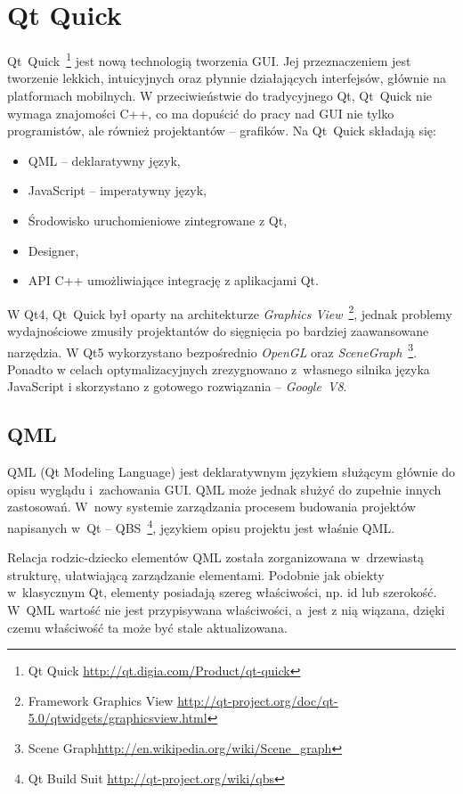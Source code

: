 \section{Qt Quick}
Qt~Quick~\footnote{Qt Quick \url{http://qt.digia.com/Product/qt-quick}} jest nową technologią tworzenia GUI. Jej przeznaczeniem jest tworzenie lekkich, intuicyjnych oraz płynnie działających interfejsów, głównie na platformach mobilnych. W przeciwieństwie do tradycyjnego Qt, Qt~Quick nie wymaga znajomości C++, co ma dopuścić do pracy nad GUI nie tylko programistów, ale również projektantów -- grafików.
Na Qt~Quick składają się:
\begin{itemize}
\item QML -- deklaratywny język,
\item JavaScript -- imperatywny język,
\item Środowisko uruchomieniowe zintegrowane z Qt,
\item Designer,
\item API C++ umożliwiające integrację z aplikacjami Qt.
\end{itemize}

W Qt4, Qt~Quick był oparty na architekturze \textit{Graphics View}~\footnote{Framework Graphics View  \url{http://qt-project.org/doc/qt-5.0/qtwidgets/graphicsview.html}}, jednak problemy wydajnościowe zmusiły projektantów do sięgnięcia po bardziej zaawansowane narzędzia. W Qt5 wykorzystano bezpośrednio \textit{OpenGL} oraz \textit{SceneGraph}~\footnote{Scene Graph\url{http://en.wikipedia.org/wiki/Scene\_graph}}. Ponadto w celach optymalizacyjnych zrezygnowano z~własnego silnika języka JavaScript i skorzystano z gotowego rozwiązania -- \textit{Google~V8}.

\subsection{QML}
QML (Qt Modeling Language) jest deklaratywnym językiem służącym głównie do opisu wyglądu i~zachowania GUI. QML może jednak służyć do zupełnie innych zastosowań. W~nowy systemie zarządzania procesem budowania projektów napisanych w~Qt -- QBS~\footnote{Qt Build Suit \url{http://qt-project.org/wiki/qbs}}, językiem opisu projektu jest właśnie QML.\newline

Relacja rodzic-dziecko elementów QML została zorganizowana w~drzewiastą strukturę, ułatwiającą zarządzanie elementami. Podobnie jak obiekty w~klasycznym Qt, elementy posiadają szereg właściwości, np. id lub szerokość. W~QML wartość nie jest przypisywana właściwości, a~jest z nią wiązana, dzięki czemu właściwość ta może być stale aktualizowana.\newline

